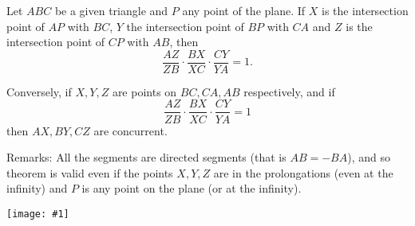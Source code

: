 \documentclass[12pt]{article}
\newcommand{\figuraex}[2]{\begin{center}\texttt{[image: \#1]}\end{center}}
\begin{document}
Let $ABC$ be a given triangle and $P$ any point of the plane. If $X$ is the intersection point of $AP$ with $BC$, $Y$ the intersection point of $BP$ with $CA$ and $Z$ is the intersection point of $CP$ with $AB$, then
$$\frac{AZ}{ZB}\cdot\frac{BX}{XC}\cdot\frac{CY}{YA}=1.$$

Conversely, if $X,Y,Z$ are points on $BC,CA,AB$ respectively, and if 
$$\frac{AZ}{ZB}\cdot\frac{BX}{XC}\cdot\frac{CY}{YA}=1$$
then $AX,BY,CZ$ are concurrent.

Remarks: All the segments are directed segments (that is $AB=-BA$), and so theorem is valid even if the points $X,Y,Z$ are in the prolongations (even at the infinity) and $P$ is any point on the plane (or at the infinity).

\figuraex{ceva}{scale=0.75}
\end{document}
